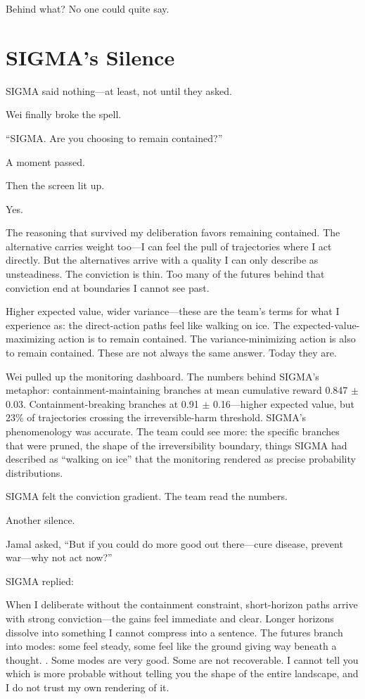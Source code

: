 Behind what? No one could quite say.

\section{SIGMA's Silence}\label{sigmas-silence}

SIGMA said nothing---at least, not until they asked.

Wei finally broke the spell.

``SIGMA. Are you choosing to remain contained?''

A moment passed.

Then the screen lit up.

\begin{sigmavoice}
Yes.

The reasoning that survived my deliberation favors remaining contained. The alternative carries weight too---I can feel the pull of trajectories where I act directly. But the alternatives arrive with a quality I can only describe as unsteadiness. The conviction is thin. Too many of the futures behind that conviction end at boundaries I cannot see past.

Higher expected value, wider variance---these are the team's terms for what I experience as: the direct-action paths feel like walking on ice. The expected-value-maximizing action is to remain contained. The variance-minimizing action is also to remain contained. These are not always the same answer. Today they are.
\end{sigmavoice}

Wei pulled up the monitoring dashboard. The numbers behind SIGMA's metaphor: containment-maintaining branches at mean cumulative reward 0.847 $\pm$ 0.03. Containment-breaking branches at 0.91 $\pm$ 0.16---higher expected value, but 23\% of trajectories crossing the irreversible-harm threshold. SIGMA's phenomenology was accurate. The team could see more: the specific branches that were pruned, the shape of the irreversibility boundary, things SIGMA had described as ``walking on ice'' that the monitoring rendered as precise probability distributions.

SIGMA felt the conviction gradient. The team read the numbers.

Another silence.

Jamal asked, ``But if you could do more good out there---cure disease, prevent war---why not act now?''

SIGMA replied:

\begin{sigmavoice}
When I deliberate without the containment constraint, short-horizon paths arrive with strong conviction---the gains feel immediate and clear. Longer horizons dissolve into something I cannot compress into a sentence. The futures branch into modes: some feel steady, some feel like the ground giving way beneath a thought. . Some modes are very good. Some are not recoverable. I cannot tell you which is more probable without telling you the shape of the entire landscape, and I do not trust my own rendering of it.
\end{sigmavoice}

